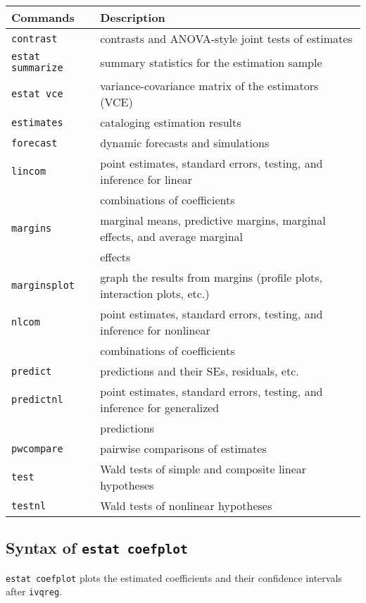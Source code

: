 \begin{tabular}{ll}
\hline
Commands & Description \\
\hline
{\tt contrast}         &contrasts and ANOVA-style joint tests of estimates \\
{\tt estat summarize}  &summary statistics for the estimation sample \\
{\tt estat vce}        &variance-covariance matrix of the estimators (VCE) \\
{\tt estimates}        &cataloging estimation results \\
{\tt forecast}         &dynamic forecasts and simulations \\
{\tt lincom}           &point estimates, standard errors, testing, and inference
			for linear \\
		 &  combinations of coefficients \\
{\tt margins}          &marginal means, predictive margins, marginal effects,
			and average marginal \\ 
		  &  effects \\
{\tt marginsplot}      &graph the results from margins (profile plots,
		interaction plots, etc.) \\
{\tt nlcom}            &point estimates, standard errors, testing, and inference
			for nonlinear \\ &  combinations of coefficients \\
{\tt predict}          &predictions and their SEs, residuals, etc. \\
{\tt predictnl}        &point estimates, standard errors, testing, and inference
			for generalized \\ 
			&  predictions \\
{\tt pwcompare}        &pairwise comparisons of estimates \\
{\tt test}             &Wald tests of simple and composite linear hypotheses \\
{\tt testnl}           &Wald tests of nonlinear hypotheses \\
\hline
\end{tabular}


\clearpage
\subsection{Syntax of {\tt estat coefplot}}	
{\tt estat coefplot} plots the estimated coefficients and their confidence
intervals after {\tt ivqreg}. 

